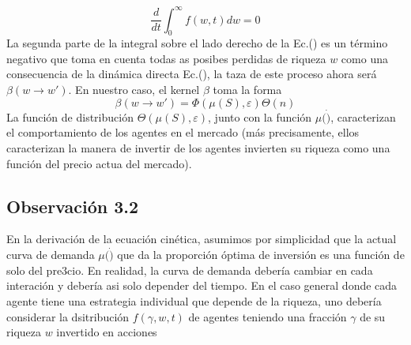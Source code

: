 \documentclass[12pt]{article}
\begin{document}
\begin{itemize}
\begin{equation}
\frac{d}{dt} \int^{\infty}_{0} f(w,t)dw=0
\end{equation}
La segunda parte de la integral sobre el lado derecho de la Ec.(\cite{26}) es un término negativo que toma en cuenta todas as posibes perdidas de riqueza $w$ como una consecuencia de la dinámica directa Ec.(\cite{ec14}), la taza de este proceso ahora será $\beta(w\rightarrow w')$. En nuestro caso, el kernel $\beta$ toma la forma
\begin{equation}
\beta(w\rightarrow w') = \Phi(\mu(S),\varepsilon)\Theta(n)
\end{equation}
La función de distribución $\Theta (\mu(S),\varepsilon)$, junto con la función $\mu(\dot)$, caracterizan el comportamiento de los agentes en el mercado (más precisamente, ellos caracterizan la manera de invertir de los agentes invierten su riqueza como una función del precio actua del mercado).
\subsection*{Observación 3.2} En la derivación de la ecuación cinética, asumimos por simplicidad que la actual curva de demanda $\mu(\dot)$ que da la proporción óptima de inversión es una función de solo del pre3cio. En realidad, la curva de demanda debería cambiar en cada interación y debería asi solo depender del tiempo. En el caso general donde cada agente tiene una estrategia individual que depende de la riqueza, uno debería considerar la dsitribución $f(\gamma,w,t)$ de agentes teniendo una fracción $\gamma$ de su riqueza $w$ invertido en acciones
\end{itemize}
\end{document}
